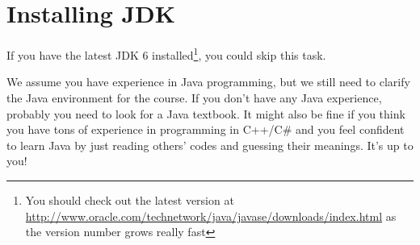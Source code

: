 
\section{Installing JDK}

If you have the latest JDK 6 installed\footnote{You should check out the latest
version at
\url{http://www.oracle.com/technetwork/java/javase/downloads/index.html} as the
version number grows really fast}, you could skip this task.

We assume you have experience in Java programming, but we still need to clarify
the Java environment for the course. If you don't have any Java experience,
probably you need to look for a Java textbook. It might also be fine if you
think you have tons of experience in programming in C++/C\# and you feel
confident to learn Java by just reading others' codes and guessing their
meanings. It's up to you!

